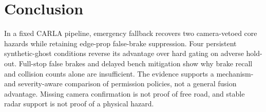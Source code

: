 \documentclass[conference]{IEEEtran}
\begin{document}
\section{Conclusion}
In a fixed CARLA pipeline, emergency fallback recovers two camera-vetoed core
hazards while retaining edge-prop false-brake suppression. Four persistent
synthetic-ghost conditions reverse its advantage over hard gating on adverse
hold-out. Full-stop false brakes and delayed bench mitigation show why brake
recall and collision counts alone are insufficient. The evidence supports a
mechanism- and severity-aware comparison of permission policies, not a general
fusion advantage. Missing camera confirmation is not proof of free road, and
stable radar support is not proof of a physical hazard.

\balance


\end{document}
